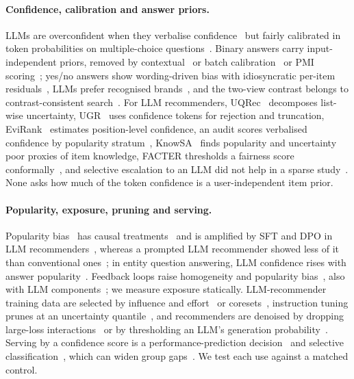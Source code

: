 \paragraph{Confidence, calibration and answer priors.}
LLMs are overconfident when they verbalise confidence~\citep{xiong2024llmuncertainty} but fairly calibrated in token probabilities on
multiple-choice questions~\citep{kadavath2022language}. Binary answers carry input-independent priors, removed by
contextual~\citep{zhao2021calibrate} or batch calibration~\citep{zhou2024batch} or PMI scoring~\citep{holtzman2021surface}; yes/no
answers show wording-driven bias with idiosyncratic per-item residuals~\citep{huang2026yesno}, LLMs prefer recognised
brands~\citep{chu2026incumbent}, and the two-view contrast \method{} belongs to contrast-consistent search~\citep{burns2023ccs}. For LLM
recommenders, UQRec~\citep{kweon2025uqrec} decomposes list-wise uncertainty, UGR~\citep{fan2026ugr} uses confidence tokens for
rejection and truncation, EviRank~\citep{yan2026evirank} estimates position-level confidence, an audit scores verbalised confidence by
popularity stratum~\citep{ravikumar2026hallucinating}, KnowSA~\citep{lee2026knowsa} finds popularity and uncertainty poor proxies of
item knowledge, FACTER thresholds a fairness score conformally~\citep{fayyazi2025facter}, and selective escalation to an LLM did not
help in a sparse study~\citep{zhou2026routerec}. None asks how much of the token confidence is a user-independent item prior.

\paragraph{Popularity, exposure, pruning and serving.}
Popularity bias~\citep{abdollahpouri2017controlling} has causal treatments~\citep{wei2021macr,zhang2021pda} and is amplified by SFT
and DPO in LLM recommenders~\citep{gao2025flower,gao2025sprec}, whereas a prompted LLM recommender showed less of it than conventional
ones~\citep{lichtenberg2024popularity}; in entity question answering, LLM confidence rises with answer popularity~\citep{ni2026popular}.
Feedback loops raise homogeneity and popularity bias~\citep{chaney2018feedback,mansoury2020feedback}, also with LLM
components~\citep{park2026echotrace}; we measure exposure statically. LLM-recommender training data are selected by influence and
effort~\citep{lin2024dealrec} or coresets~\citep{mei2025goracs}, instruction tuning prunes at an uncertainty quantile~\citep{wu2025unit},
and recommenders are denoised by dropping large-loss interactions~\citep{wang2021tce} or by thresholding an LLM's generation
probability~\citep{wang2026llm4dsr}. Serving by a confidence score is a performance-prediction decision~\citep{bellogin2011predicting}
and selective classification~\citep{geifman2017selective}, which can widen group gaps~\citep{jones2021selective}. We test each use
against a matched control.
